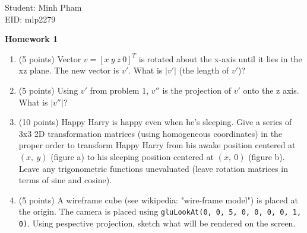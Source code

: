 \documentclass[13pt]{letter}
\begin{document}
Student: Minh Pham \\
EID: mlp2279

\begin{center}
	\textbf{Homework 1}
\end{center}

\begin{enumerate}
	\item (5 points)
	Vector $v = [x~y~z~0]^T$ is rotated about the x-axis until it lies in the xz plane. The new vector is $v'$. What is $|v'|$ (the length of $v'$)?
	
	\vspace{13pt}

	\item (5 points)
	Using $v'$ from problem 1, $v''$ is the projection of $v'$ onto the z axis. What is $|v''|$?

	\vspace{13pt}
	
	\item (10 points)
	Happy Harry is happy even when he's sleeping. Give a series of 3x3 2D transformation matrices (using homogeneous coordinates) in the proper order to transform Happy Harry from his awake position centered at $(x,~y)$ (figure a) to his sleeping position centered at $(x,~0)$ (figure b).
	Leave any trigonometric functions unevaluated (leave rotation matrices in terms of sine and cosine).
	


	
	\vspace{13pt}
	
	\item (5 points)
	A wireframe cube (see wikipedia: "wire-frame model") is placed at the origin. The camera is placed using \texttt{gluLookAt(0, 0, 5, 0, 0, 0, 0, 1, 0)}. Using pespective projection, sketch what will be rendered on the screen.


\end{enumerate}
\end{document}
